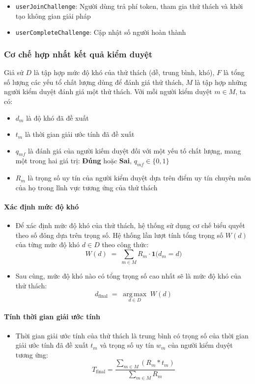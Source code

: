 \begin{itemize}
  \item \texttt{userJoinChallenge}: Người dùng trả phí token, tham gia thử thách và khởi tạo không gian giải pháp
  \item \texttt{userCompleteChallenge}: Cập nhật số người hoàn thành
\end{itemize}

\subsubsection{Cơ chế hợp nhất kết quả kiểm duyệt}

Giả sử $D$ là tập hợp mức độ khó của thử thách (dễ, trung bình, khó), $F$ là tổng số lượng các yếu tổ chất lượng dùng để đánh giá thử thách, $M$ là tập hợp những người kiểm duyệt đánh giá một thử thách. Với mỗi người kiểm duyệt $m \in M$, ta có:
\begin{itemize}
  \item $d_m$ là độ khó đã đề xuất
  \item $t_m$ là thời gian giải ước tính đã đề xuất
  \item $q_{mf}$ là đánh giá của người kiếm duyệt đối với một yếu tố chất lượng, mang một trong hai giá trị: \textbf{Đúng} hoặc \textbf{Sai}, $q_{mf} \in \{0,1\}$
  \item $R_m$ là trọng số uy tín của người kiểm duyệt dựa trên điểm uy tín chuyên môn của họ trong lĩnh vực tương ứng của thử thách
\end{itemize}

\paragraph{Xác định mức độ khó}
\begin{itemize}
  \item Để xác định mức độ khó của thử thách, hệ thống sử dụng cơ chế biểu quyết theo số đông dựa trên trọng số. Hệ thống lần lượt tính tổng trọng số $W(d)$ của từng mức độ khó $d \in D$ theo công thức:
        \[W(d) \;=\; \sum_{m \in M} R_m \cdot \mathbf{1}\big(d_m = d\big)\]
  \item Sau cùng, mức độ khó nào có tổng trọng số cao nhất sẽ là mức độ khó của thử thách:
        \[d_{\text{final}} \;=\; \underset{d \in D}{\operatorname{arg\,max}}\; W(d)\]
\end{itemize}

\paragraph{Tính thời gian giải ước tính}
\begin{itemize}
  \item Thời gian giải ước tính của thử thách là trung bình có trọng số của thời gian giải ước tính đã đề xuất $t_{m}$ và trọng số uy tín $w_m$ của người kiểm duyệt tương ứng:
        \[T_{\text{final}}= \frac{\displaystyle\sum_{m \in M} (R_m*t_m)}{\displaystyle\sum_{m \in M}R_m}\]
\end{itemize}

